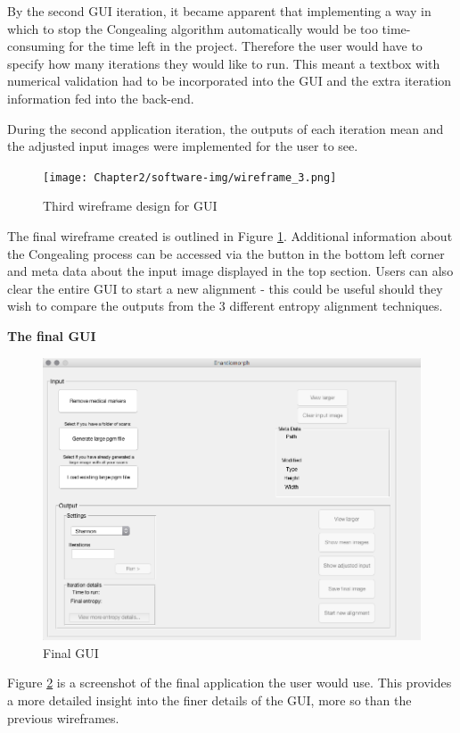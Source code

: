 By the second \acrshort{GUI} iteration, it became apparent that implementing a way in which to stop the \Gls{Congealing} algorithm automatically would be too time-consuming for the time left in the project. Therefore the user would have to specify how many iterations they would like to run. This meant a textbox with numerical validation had to be incorporated into the \acrshort{GUI} and the extra iteration information fed into the back-end.

During the second application iteration, the outputs of each iteration mean and the adjusted input images were implemented for the user to see.

\begin{figure}[H]
  \center
  \texttt{[image: Chapter2/software-img/wireframe\_3.png]}
  \caption{Third wireframe design for GUI}
  \label{fig:wireframe3}
\end{figure}

The final wireframe created is outlined in Figure \ref{fig:wireframe3}. Additional information  about the \Gls{Congealing} process can be accessed via the button in the bottom left corner and meta data about the input image displayed in the top section. Users can also clear the entire \acrshort{GUI} to start a new alignment - this could be useful should they wish to compare the outputs from the 3 different entropy alignment techniques.

\noindent \textbf{The final \acrshort{GUI}}

\begin{figure}[H]
  \center
  \includegraphics[scale=0.5]{Chapter2/software-img/final_gui.png}
  \caption{Final GUI}
  \label{fig:final_gui}
\end{figure}

Figure \ref{fig:final_gui} is a screenshot of the final application the user would use. This provides a more detailed insight into the finer details of the \acrshort{GUI}, more so than the previous wireframes.
